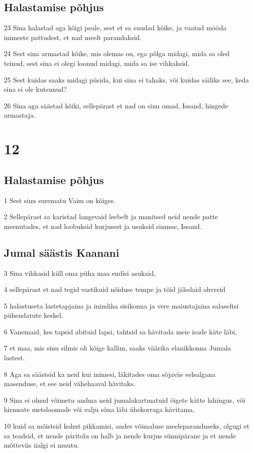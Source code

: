 \section*{Halastamise põhjus}

\par 23 Sina halastad aga kõigi peale, sest et sa suudad kõike, ja vaatad mööda inimeste pattudest, et nad meelt parandaksid.
\par 24 Sest sina armastad kõike, mis olemas on, ega põlga midagi, mida sa oled teinud, sest sina ei olegi loonud midagi, mida sa ise vihkaksid.
\par 25 Sest kuidas saaks midagi püsida, kui sina ei tahaks, või kuidas säiliks see, keda sina ei ole kutsunud?
\par 26 Sina aga säästad kõiki, sellepärast et nad on sinu omad, Issand, hingede armastaja. 

\chapter{12}

\section*{Halastamise põhjus}

\par 1 Sest sinu surematu Vaim on kõiges.
\par 2 Sellepärast sa karistad langevaid leebelt ja manitsed neid nende patte meenutades, et nad loobuksid kurjusest ja usuksid sinusse, Issand. 

\section*{Jumal säästis Kaanani}

\par 3 Sina vihkasid küll oma püha maa endisi asukaid,
\par 4 sellepärast et nad tegid vastikuid nõiduse tempe ja tõid jäledaid ohvreid
\par 5 halastuseta lastetapjaina ja inimliha sisikonna ja vere maiustajaina salaseltsi pühendatute keskel.
\par 6 Vanemaid, kes tapsid abituid lapsi, tahtsid sa hävitada meie isade käte läbi,
\par 7 et maa, mis sinu silmis oli kõige kallim, saaks väärika elanikkonna Jumala lastest.
\par 8 Aga sa säästsid ka neid kui inimesi, läkitades oma sõjaväe eelsalgana masenduse, et see neid vähehaaval hävitaks.
\par 9 Sina ei olnud võimetu andma neid jumalakartmatuid õigete kätte lahingus, või hirmsate metsloomade või valju sõna läbi ühekorraga hävitama,
\par 10 kuid sa mõistsid kohut pikkamisi, andes võimaluse meeleparanduseks, olgugi et sa teadsid, et nende päritolu on halb ja nende kurjus sünnipärane ja et nende mõtteviis iialgi ei muutu. 

